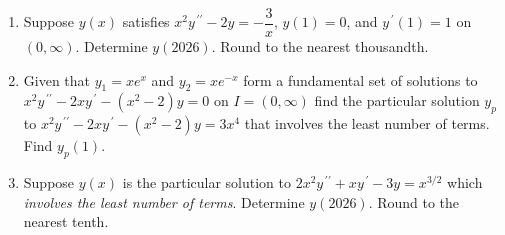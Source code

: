 \documentclass{ximera}
\begin{document}
\begin{enumerate}[label=(\arabic*)]












\item Suppose $y(x)$ satisfies $x^2y^{\,\prime\prime}-2y=-\dfrac{3}{x}$, $y(1)=0$, and $y^{\,\prime}(1)=1$ on $(0,\infty)$.  Determine $y(2026)$.  Round to the nearest thousandth.








\item Given that $y_1=xe^x$ and $y_2=xe^{-x}$ form a fundamental set of solutions to $x^2y^{\,\prime\prime}-2xy^{\,\prime}-(x^2-2)y=0$ on $I=(0,\infty)$ find the particular solution $y_p$ to $x^2y^{\,\prime\prime}-2xy^{\,\prime}-(x^2-2)y=3x^4$ that involves the least number of terms.  Find $y_p(1)$.









\item Suppose $y(x)$ is the particular solution to $2x^2 y^{\,\prime\prime}+xy^{\,\prime}-3y=x^{3/2}$ which \emph{involves the least number of terms}.  Determine $y(2026)$.  Round to the nearest tenth.


\end{enumerate}
\end{document}
